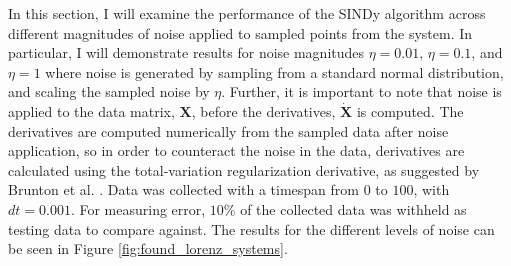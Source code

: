 \documentclass[10pt]{paper}
\begin{document}
In this section, I will examine the performance of the SINDy algorithm across different magnitudes of noise applied to sampled points from the system. 
In particular, I will demonstrate results for noise magnitudes $\eta = 0.01$, $\eta = 0.1$, and $\eta = 1$ where noise is generated by sampling from a standard normal distribution, and scaling the sampled noise by $\eta$. 
Further, it is important to note that noise is applied to the data matrix, $\mathbf X$, before the derivatives, $\mathbf {\dot X}$ is computed. 
The derivatives are computed numerically from the sampled data after noise application, so in order to counteract the noise in the data, derivatives are calculated using the total-variation regularization derivative, as suggested by Brunton et al. \cite{sindy}. 
Data was collected with a timespan from $0$ to $100$, with $dt = 0.001$. For measuring error, $10\%$ of the collected data was withheld as testing data to compare against. 
The results for the different levels of noise can be seen in Figure \ref{fig:found_lorenz_systems}.
\end{document}
